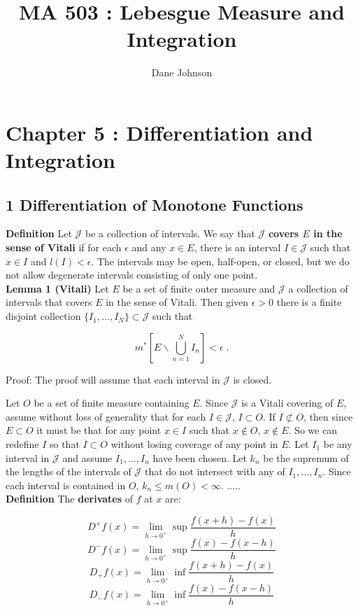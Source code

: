 \documentclass[a4paper]{article}
\title{MA 503 : Lebesgue Measure and Integration}
\author{Dane Johnson}
\begin{document}
\maketitle

\section*{Chapter 5 : Differentiation and Integration}

\subsection*{1 Differentiation of Monotone Functions}

{\bf Definition } Let $\mathcal{J}$ be a collection of intervals. We say that $\mathcal{J}$ {\bf covers $E$ in the sense of Vitali} if for each $\epsilon$ and any $x \in E$, there is an interval $I \in \mathcal{J}$ such that $x \in I$ and $l(I) < \epsilon$. The intervals may be open, half-open, or closed, but we do not allow degenerate intervals consisting of only one point. \\

{\bf Lemma 1 (Vitali)} Let $E$ be a set of finite outer measure and $\mathcal{J}$ a collection of intervals that covers $E$ in the sense of Vitali. Then given $\epsilon >0$ there is a finite disjoint collection $\{I_1,...,I_N\}\subset \mathcal{J}$ such that 

$$m^*\left[E \backslash \bigcup_{n=1}^N I_n \right] < \epsilon \;.$$

Proof: The proof will assume that each interval in $\mathcal{J}$ is closed.

Let $O$ be a set of finite measure containing $E$. Since $\mathcal{J}$ is a Vitali covering of $E$, assume without loss of generality that for each $I \in \mathcal{J}$, $I\subset O$. If $I \not\subset O$, then since $E \subset O$ it must be that for any point $x \in I$ such that $x \not\in O$, $x \not\in E$. So we can redefine $I$ so that $I \subset O$ without losing coverage of any point in $E$. Let $I_1$ be any interval in $\mathcal{J}$ and assume $I_1,...,I_n$ have been chosen. Let $k_n$ be the supremum of the lengths of the intervals of $\mathcal{J}$ that do not intersect with any of $I_1,...,I_n$. Since each interval is contained in $O$, $k_n \leq m(O) < \infty$. .....\\

{\bf Definition} The {\bf derivates} of $f$ at $x$ are:

$$D^+ f(x) = \lim_{h \rightarrow 0^+} \sup \frac{f(x+h) - f(x)}{h}$$
$$D^- f(x) = \lim_{h \rightarrow 0^+} \sup \frac{f(x) - f(x-h)}{h}$$
$$D_+ f(x) = \lim_{h \rightarrow 0^+} \inf \frac{f(x+h) - f(x)}{h}$$
$$D_- f(x) = \lim_{h \rightarrow 0^+} \inf \frac{f(x) - f(x-h)}{h}$$
\end{document}
